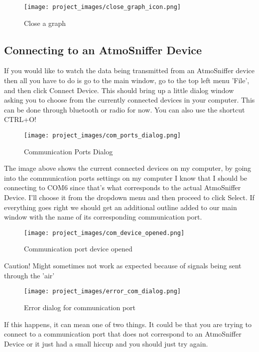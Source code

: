 \begin{figure}[H]
\centering
\texttt{[image: project\_images/close\_graph\_icon.png]}
 \caption{Close a graph}
 \label{fig:close a graph}
\end{figure}

\subsection{Connecting to an AtmoSniffer Device}
	If you would like to watch the data being transmitted from an AtmoSniffer device then all you have to do is go to the main window, go to the top left menu 'File', and then click Connect Device. This should bring up a little dialog window asking you to choose from the currently connected devices in your computer. This can be done through bluetooth or radio for now.
You can also use the shortcut CTRL+O!

\begin{figure}[H]
\centering
\texttt{[image: project\_images/com\_ports\_dialog.png]}
 \caption{Communication Ports Dialog}
 \label{fig:com ports dialog}
\end{figure}

	The image above shows the current connected devices on my computer, by going into the communication ports settings on my computer I know that I should be connecting to COM6 since that's what corresponds to the actual AtmoSniffer Device. I'll choose it from the dropdown menu and then proceed to click Select. If everything goes right we should get an additional outline added to our main window with the name of its corresponding communication port.

\begin{figure}[H]
\centering
\texttt{[image: project\_images/com\_device\_opened.png]}
 \caption{Communication port device opened}
 \label{fig:com device opened}
\end{figure}

	Caution! Might sometimes not work as expected because of signals being sent through the 'air'

\begin{figure}[H]
\centering
\texttt{[image: project\_images/error\_com\_dialog.png]}
 \caption{Error dialog for communication port}
 \label{fig:com port error}
\end{figure}

	If this happens, it can mean one of two things. It could be that you are trying to connect to a communication port that does not correspond to an AtmoSniffer Device or it just had a small hiccup and you should just try again.

